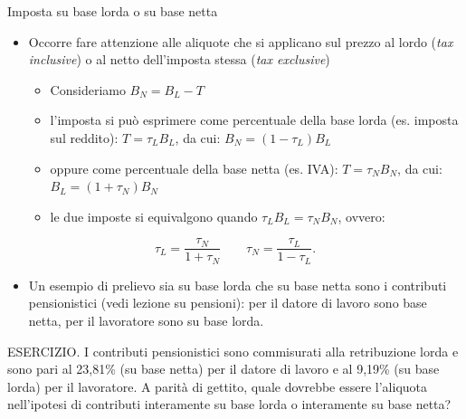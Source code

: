\documentclass[11pt]{beamer}
\begin{document}
\begin{frame}{Imposta su base lorda o su base netta}
\begin{itemize}
\item Occorre fare attenzione alle aliquote che si applicano sul prezzo al lordo
(\emph{tax inclusive}) o al netto dell'imposta stessa (\emph{tax exclusive})
\begin{itemize}
\item Consideriamo $B_N=B_L-T$
\item l'imposta si può esprimere come percentuale della base lorda (es. imposta sul reddito): $T=\tau_LB_L$, da cui: $B_N=(1-\tau_L)B_L$
\item oppure come percentuale della base netta (es. IVA): $T=\tau_NB_N$, da cui: $B_L=(1+\tau_N)B_N$
\item le due imposte si equivalgono quando $\tau_LB_L=\tau_NB_N$, ovvero:
\end{itemize}
\end{itemize}
\begin{equation*}
\tau_L =\frac{\tau_N}{1+\tau_N} \qquad\tau_N =\frac{\tau_L}{1-\tau_L}.
\end{equation*}
\begin{itemize}
\item Un esempio di prelievo sia su base lorda che su base netta sono i contributi pensionistici (vedi lezione su pensioni): per il datore di lavoro sono base netta, per il lavoratore sono su base lorda.
\end{itemize}
\begin{block}{}
\footnotesize
\alert{ESERCIZIO}. I contributi pensionistici sono commisurati alla retribuzione lorda e sono pari al 23,81\% (su base netta) per il datore di lavoro e al 9,19\% (su base lorda) per il lavoratore. A parità di gettito, quale dovrebbe essere l'aliquota nell'ipotesi di contributi interamente su base lorda o interamente su base netta?
\end{block}
\end{frame}
\end{document}

